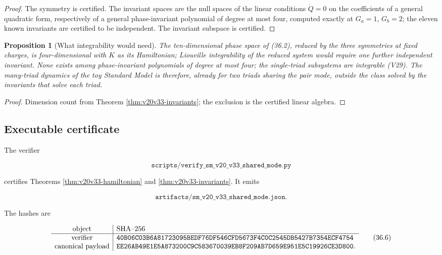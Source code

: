 \documentclass[11pt]{article}
\newtheorem{proposition}[theorem]{Proposition}
\theoremstyle{remark}
\begin{document}
\begin{proof}
The symmetry is certified.  The invariant spaces are the null spaces
of the linear conditions \(\dot Q=0\) on the coefficients of a general
quadratic form, respectively of a general phase-invariant polynomial
of degree at most four, computed exactly at \(G_a=1\), \(G_b=2\); the
eleven known invariants are certified to be independent.  The
invariant subspace is certified.
\end{proof}

\begin{proposition}[What integrability would need]
\label{prop:v20v33-reduced}
The ten-dimensional phase space of (36.2), reduced by the three
symmetries at fixed charges, is four-dimensional with \(K\) as its
Hamiltonian; Liouville integrability of the reduced system would
require one further independent invariant.  None exists among
phase-invariant polynomials of degree at most four; the single-triad
subsystems are integrable (V29).  The many-triad dynamics of the toy
Standard Model is therefore, already for two triads sharing the
pair mode, outside the class solved by the invariants that solve
each triad.
\end{proposition}

\begin{proof}
Dimension count from Theorem \ref{thm:v20v33-invariants}; the
exclusion is the certified linear algebra.
\end{proof}

\subsection{Executable certificate}

The verifier

\[
 \texttt{scripts/verify\_sm\_v20\_v33\_shared\_mode.py}               \tag{36.4}
\]

certifies Theorems \ref{thm:v20v33-hamiltonian} and
\ref{thm:v20v33-invariants}.  It emits

\[
 \texttt{artifacts/sm\_v20\_v33\_shared\_mode.json}.                  \tag{36.5}
\]

The hashes are

\[
\begin{array}{c|l}
\hbox{object}&\hbox{SHA--256}\\ \hline
\hbox{verifier}&
\texttt{40B06C03B6A81723095BEDF76DF546CFD5673F4C0C2545DB5427B7354ECF4754}\\
\hbox{canonical payload}&
\texttt{EE26AB49E1E5A873200C9C583670039EB8F209AB7D659E951E5C19926CE3D800}.
\end{array}                                                     \tag{36.6}
\]
\end{document}
